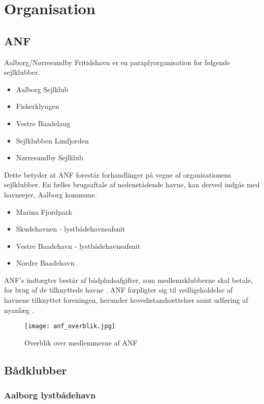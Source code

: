 \section{Organisation}

\subsection{ANF}

Aalborg/Nørresundby Fritidshavn er en paraplyorganisation for følgende sejlklubber. \cite{anf_havnereglement}
\begin{itemize}
	\item Aalborg Sejlklub
	\item Fiskerklyngen
	\item Vestre Baadelaug
	\item Sejlklubben Limfjorden
	\item Nørresundby Sejlklub
\end{itemize}
 
 Dette betyder at ANF forestår forhandlinger på vegne af organisationens sejlklubber. En fælles brugsaftale af nedenstådende havne, kan derved indgås med havneejer, Aalborg kommune.

 \begin{itemize}
 	\item Marina Fjordpark
 	\item Skudehavnen - lystbådehavnsafsnit
 	\item Vestre Baadehavn - lystbådehavnsafsnit
 	\item Nordre Baadehavn
 \end{itemize}

 ANF's indtægter består af bådpladsafgifter, som medlemsklubberne skal betale, for brug af de tilknyttede havne \cite{anf_budget_2013}. ANF forpligter sig til vedligeholdelse af havnene tilknyttet foreningen, herunder hovedistandsættelser samt udføring af nyanlæg \cite{anf_brugsaftale_2012}.

 \begin{figure}
 	\begin{center}
 		\texttt{[image: anf\_overblik.jpg]}
 	\end{center}
 	\caption{Overblik over medlemmerne af ANF}
 	\label{fig:anf_overblik}
 \end{figure}

\subsection{Bådklubber}

\subsubsection{Aalborg lystbådehavn}